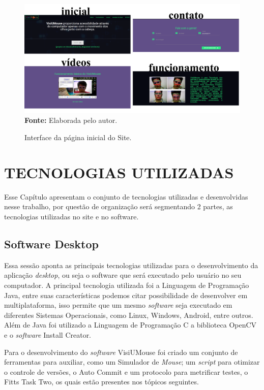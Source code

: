\begin{figure}[htbp]
\caption{Interface da página inicial do Site.} 
\centering \includegraphics[scale=.165]{img/site.png}
{\fontsize{11}{11}\selectfont \textbf{Fonte:} Elaborada pelo autor.}
\label{fig:site}
\end{figure}

\chapter{TECNOLOGIAS UTILIZADAS}\label{CAP6-tecnilogias-utilizadas}
Esse Capítulo apresentam o conjunto de tecnologias utilizadas e desenvolvidas nesse trabalho, por questão de organização será segmentando 2 partes, as tecnologias utilizadas no site e no software.

\section{Software Desktop}\label{Sub:tecnologias-software}
Essa sessão aponta as principais tecnologias utilizadas para o desenvolvimento da aplicação \textit{desktop}, ou seja o software que será executado pelo usuário no seu computador. A principal tecnologia utilizada foi a Linguagem de Programação Java, entre suas características podemos citar possibilidade de desenvolver em multiplataforma, isso permite que um mesmo \textit{software} seja executado em diferentes Sistemas Operacionais, como Linux, Windows, Android, entre outros. Além de Java foi utilizado a Linguagem de Programação C a biblioteca OpenCV e o \textit{software} Install Creator. 

Para o desenvolvimento do \textit{software} VisiUMouse foi criado um conjunto de ferramentas para auxiliar, como um Simulador de \textit{Mouse}; um \textit{script} para otimizar o controle de versões, o Auto Commit e um protocolo para metrificar testes, o Fitts Task Two, os quais estão presentes nos tópicos seguintes.

